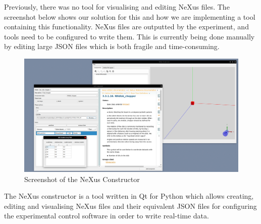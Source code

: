 Previously, there was no tool for visualising and editing NeXus files. The screenshot below shows our solution for this and how we are implementing a tool containing this functionality. NeXus files are outputted by the experiment, and tools need to be configured to write them. This is currently being done manually by editing large JSON files which is both fragile and time-consuming.

\begin{figure}
\caption{Screenshot of the NeXus Constructor}
\includegraphics[width=\linewidth]{screenshot.png}
\end{figure}

The NeXus constructor is a tool written in Qt for Python which allows creating, editing and visualising NeXus files and their equivalent JSON files for configuring the experimental control software in order to write real-time data. 
